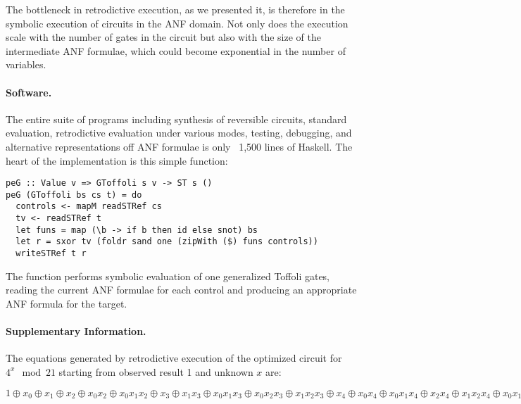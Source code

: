 \documentclass[sigplan]{acmart}
\begin{document}
The bottleneck in retrodictive execution, as we presented it, is
therefore in the symbolic execution of circuits in the ANF domain. Not
only does the execution scale with the number of gates in the circuit
but also with the size of the intermediate ANF formulae, which could
become exponential in the number of variables.

\paragraph*{Software.}
The entire suite of programs including synthesis of reversible
circuits, standard evaluation, retrodictive evaluation under various
modes, testing, debugging, and alternative representations off ANF
formulae is only ~1,500 lines of Haskell. The heart of the
implementation is this simple function:

\begin{verbatim}
peG :: Value v => GToffoli s v -> ST s ()
peG (GToffoli bs cs t) = do
  controls <- mapM readSTRef cs
  tv <- readSTRef t
  let funs = map (\b -> if b then id else snot) bs
  let r = sxor tv (foldr sand one (zipWith ($) funs controls))
  writeSTRef t r
\end{verbatim}
The function performs symbolic evaluation of one generalized Toffoli
gates, reading the current ANF formulae for each control and producing
an appropriate ANF formula for the target.

\paragraph*{Supplementary Information.} 
\label{par:shor21}

The equations generated by retrodictive execution of the optimized
circuit for $4^x \mod{21}$ starting from observed result 1 and unknown
$x$ are:

\bigskip

$1 \oplus x_0 \oplus x_1 \oplus x_2 \oplus x_0x_2 \oplus x_0x_1x_2
\oplus x_3 \oplus x_1x_3 \oplus x_0x_1x_3 \oplus x_0x_2x_3 \oplus
x_1x_2x_3 \oplus x_4 \oplus x_0x_4 \oplus x_0x_1x_4 \oplus x_2x_4
\oplus x_1x_2x_4 \oplus x_0x_1x_2x_4 \oplus x_0x_3x_4 \oplus x_1x_3x_4
\oplus x_2x_3x_4 \oplus x_0x_2x_3x_4 \oplus x_0x_1x_2x_3x_4 \oplus x_5
\oplus x_1x_5 \oplus x_0x_1x_5 \oplus x_0x_2x_5 \oplus x_1x_2x_5
\oplus x_3x_5 \oplus x_0x_3x_5 \oplus x_0x_1x_3x_5 \oplus x_2x_3x_5
\oplus x_1x_2x_3x_5 \oplus x_0x_1x_2x_3x_5 \oplus x_0x_4x_5 \oplus
x_1x_4x_5 \oplus x_2x_4x_5 \oplus x_0x_2x_4x_5 \oplus x_0x_1x_2x_4x_5
\oplus x_3x_4x_5 \oplus x_1x_3x_4x_5 \oplus x_0x_1x_3x_4x_5 \oplus
x_0x_2x_3x_4x_5 \oplus x_1x_2x_3x_4x_5 = 1$
\end{document}
